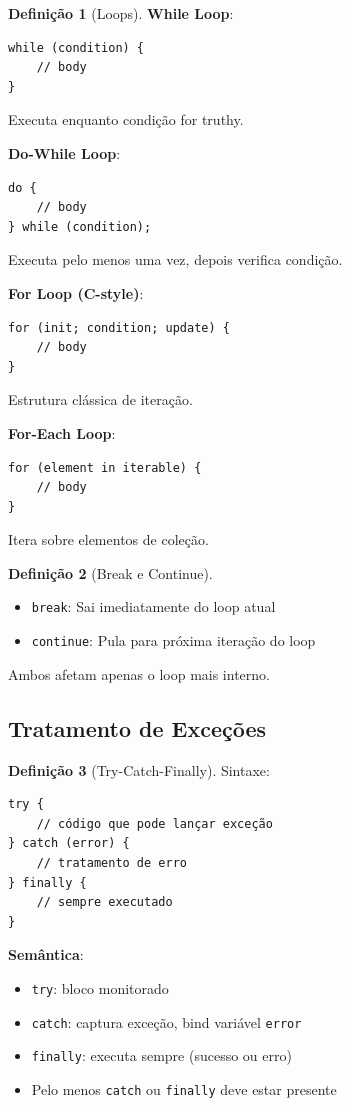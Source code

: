 \documentclass[12pt,a4paper]{article}
\theoremstyle{definition}
\newtheorem{definition}{Definição}[section]
\begin{document}
\begin{definition}[Loops]
\textbf{While Loop}:
\begin{verbatim}
while (condition) {
    // body
}
\end{verbatim}
Executa enquanto condição for truthy.

\textbf{Do-While Loop}:
\begin{verbatim}
do {
    // body
} while (condition);
\end{verbatim}
Executa pelo menos uma vez, depois verifica condição.

\textbf{For Loop (C-style)}:
\begin{verbatim}
for (init; condition; update) {
    // body
}
\end{verbatim}
Estrutura clássica de iteração.

\textbf{For-Each Loop}:
\begin{verbatim}
for (element in iterable) {
    // body
}
\end{verbatim}
Itera sobre elementos de coleção.
\end{definition}

\begin{definition}[Break e Continue]
\begin{itemize}
    \item \texttt{break}: Sai imediatamente do loop atual
    \item \texttt{continue}: Pula para próxima iteração do loop
\end{itemize}
Ambos afetam apenas o loop mais interno.
\end{definition}

\subsection{Tratamento de Exceções}

\begin{definition}[Try-Catch-Finally]
Sintaxe:
\begin{verbatim}
try {
    // código que pode lançar exceção
} catch (error) {
    // tratamento de erro
} finally {
    // sempre executado
}
\end{verbatim}

\textbf{Semântica}:
\begin{itemize}
    \item \texttt{try}: bloco monitorado
    \item \texttt{catch}: captura exceção, bind variável \texttt{error}
    \item \texttt{finally}: executa sempre (sucesso ou erro)
    \item Pelo menos \texttt{catch} ou \texttt{finally} deve estar presente
\end{itemize}
\end{definition}
\end{document}
